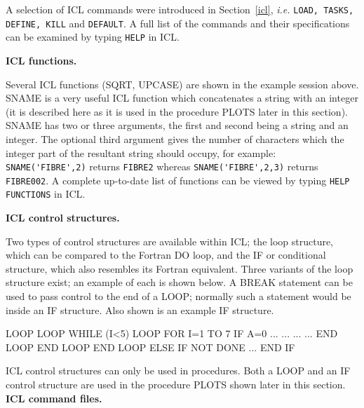 \documentclass[twoside,11pt,nolof]{starlink}
\begin{document}
A selection of ICL commands were introduced in Section~\ref{icl}, \textit{i.e.}
\texttt{LOAD, TASKS, DEFINE, KILL} and \texttt{DEFAULT}.
A full list of the commands and their specifications can be examined by
typing \texttt{HELP} in ICL.

{\smallskip\large\bf ICL functions.}

Several ICL functions (SQRT, UPCASE) are shown in the example session above.
SNAME is a very useful ICL function which concatenates a string with an
integer (it is described here as it is used in the procedure PLOTS
later in this section).
SNAME has two or three arguments, the first and second being a string and an
integer. The optional third argument gives the number of characters which
the integer part of the resultant string should occupy, for example:
\verb+SNAME('FIBRE',2)+ returns \texttt{FIBRE2} whereas
\verb+SNAME('FIBRE',2,3)+ returns \texttt{FIBRE002}.
A complete up-to-date list of functions can be viewed by typing
\texttt{HELP FUNCTIONS} in ICL.


{\smallskip\large\bf ICL control structures.}

Two types of control structures are available within ICL;
the loop structure, which can be compared to the Fortran DO loop, and
the IF or conditional structure, which also resembles its Fortran
equivalent.
Three variants of the loop structure exist; an example of each is shown below.
A BREAK statement can be used to pass control to the end of a LOOP;
normally such a statement would be inside an IF structure.
Also shown is an example IF structure.
\begin{terminalv}
LOOP          LOOP WHILE (I<5)     LOOP FOR I=1 TO 7      IF A=0
...           ...                  ...                    ...
END LOOP      END LOOP             END LOOP               ELSE IF NOT DONE
                                                          ...
                                                          END IF
\end{terminalv}
ICL control structures can only be used in procedures.
Both a LOOP and an IF control structure are used in the procedure PLOTS shown
later in this section.
\newpage
{\large\bf ICL command files.}
\end{document}
